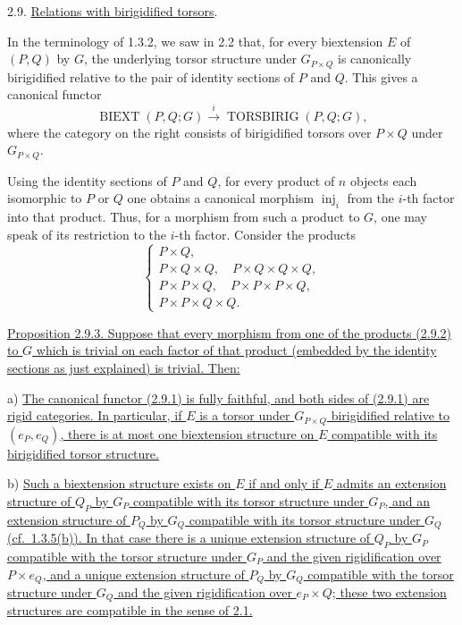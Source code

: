 
2.9. \underline{Relations with birigidified torsors}.

In the terminology of 1.3.2, we saw in 2.2 that, for every
biextension $E$ of $(P,Q)$ by $G$, the underlying torsor structure
under $G_{P\times Q}$ is canonically birigidified relative to the pair
of identity sections of $P$ and $Q$. This gives a canonical functor
\begin{equation}\tag{2.9.1}
 \operatorname{BIEXT}(P,Q;G)
 \xrightarrow{\ i\ }
 \operatorname{TORSBIRIG}(P,Q;G),
\end{equation}
where the category on the right consists of birigidified torsors over
$P\times Q$ under $G_{P\times Q}$.

Using the identity sections of $P$ and $Q$, for every product of $n$
objects each isomorphic to $P$ or $Q$ one obtains a canonical
morphism $\operatorname{inj}_i$ from the $i$-th factor into that
product. Thus, for a morphism from such a product to $G$, one may speak
of its restriction to the $i$-th factor. Consider the products
\begin{equation}\tag{2.9.2}
 \left\{
 \begin{array}{l}
 P\times Q,\\[1mm]
 P\times Q\times Q,\quad P\times Q\times Q\times Q,\\[1mm]
 P\times P\times Q,\quad P\times P\times P\times Q,\\[1mm]
 P\times P\times Q\times Q.
 \end{array}
 \right.
\end{equation}

\underline{Proposition 2.9.3. Suppose that every morphism from one of
the products (2.9.2) to $G$ which is trivial on each factor of that
product (embedded by the identity sections as just explained) is
trivial. Then:}

\medskip
\noindent
a) \underline{The canonical functor (2.9.1) is fully faithful, and
both sides of (2.9.1) are rigid categories. In particular, if $E$ is a
torsor under $G_{P\times Q}$ birigidified relative to $(e_P,e_Q)$,
there is at most one biextension structure on $E$ compatible with its
birigidified torsor structure.}

\medskip
\noindent
b) \underline{Such a biextension structure exists on $E$ if and only
if $E$ admits an extension structure of $Q_P$ by $G_P$ compatible with
its torsor structure under $G_P$, and an extension structure of $P_Q$
by $G_Q$ compatible with its torsor structure under $G_Q$
(cf.\ 1.3.5(b)). In that case there is a unique extension structure of
$Q_P$ by $G_P$ compatible with the torsor structure under $G_P$ and
the given rigidification over $P\times e_Q$, and a unique extension
structure of $P_Q$ by $G_Q$ compatible with the torsor structure under
$G_Q$ and the given rigidification over $e_P\times Q$; these two
extension structures are compatible in the sense of 2.1.}

